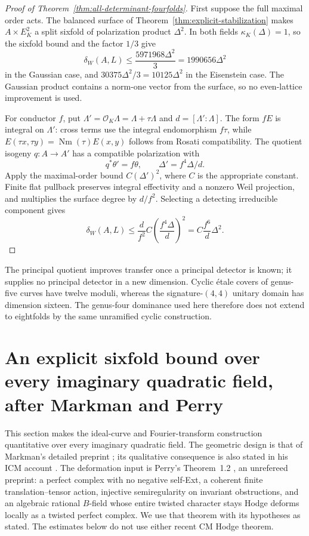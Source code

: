 \documentclass[11pt]{article}
\theoremstyle{definition}
\theoremstyle{remark}
\newcommand{\Nm}{\operatorname{Nm}}
\begin{document}
\begin{proof}[Proof of Theorem~\ref{thm:all-determinant-fourfolds}]
First suppose the full maximal order acts. The balanced surface of Theorem~\ref{thm:explicit-stabilization} makes $A\times E_K^2$ a split sixfold of polarization product $\Delta^2$. In both fields $\kappa_K(\Delta)=1$, so the sixfold bound and the factor $1/3$ give
\[
 \delta_W(A,L)\le\frac{5971968\Delta^2}{3}
 =1990656\Delta^2
\]
in the Gaussian case, and $30375\Delta^2/3=10125\Delta^2$ in the Eisenstein case. The Gaussian product contains a norm-one vector from the surface, so no even-lattice improvement is used.

For conductor $f$, put $\Lambda'=\mathcal O_K\Lambda=\Lambda+\tau\Lambda$ and $d=[\Lambda':\Lambda]$. The form $fE$ is integral on $\Lambda'$: cross terms use the integral endomorphism $f\tau$, while
$E(\tau x,\tau y)=\Nm(\tau)E(x,y)$ follows from Rosati compatibility. The quotient isogeny $q:A\to A'$ has a compatible polarization with
\[
 q^*\theta'=f\theta,
 \qquad \Delta'=f^4\Delta/d.
\]
Apply the maximal-order bound $C(\Delta')^2$, where $C$ is the appropriate constant. Finite flat pullback preserves integral effectivity and a nonzero Weil projection, and multiplies the surface degree by $d/f^2$. Selecting a detecting irreducible component gives
\[
 \delta_W(A,L)\le\frac d{f^2}C\left(\frac{f^4\Delta}{d}\right)^2
 =C\frac{f^6}{d}\Delta^2.
\]
\end{proof}

The principal quotient improves transfer once a principal detector is known; it supplies no principal detector in a new dimension. Cyclic \'etale covers of genus-five curves have twelve moduli, whereas the signature-$(4,4)$ unitary domain has dimension sixteen. The genus-four dominance used here therefore does not extend to eightfolds by the same unramified cyclic construction.
\section{An explicit sixfold bound over every imaginary quadratic field, after Markman and Perry}
\label{sec:effective-sixfolds}
This section makes the ideal-curve and Fourier-transform construction quantitative over every imaginary quadratic field. The geometric design is that of Markman's detailed preprint \cite[\S\S8--9]{MarkmanSecant}; its qualitative consequence is also stated in his ICM account \cite[Theorem~1.2]{MarkmanICM}. The deformation input is Perry's Theorem~1.2 \cite{Perry}, an unrefereed preprint: a perfect complex with no negative self-Ext, a coherent finite translation--tensor action, injective semiregularity on invariant obstructions, and an algebraic rational $B$-field whose entire twisted character stays Hodge deforms locally as a twisted perfect complex. We use that theorem with its hypotheses as stated. The estimates below do not use either recent CM Hodge theorem.
\end{document}
